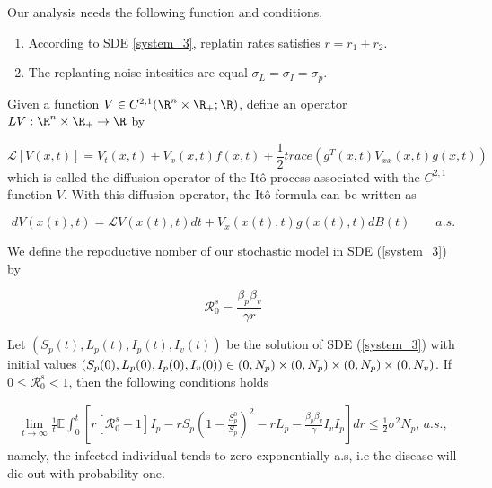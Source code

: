 Our analysis needs the following function and conditions.
\begin{enumerate}[(H-1)]
	\item
	According to SDE \eqref{system_3}, replatin rates satisfies 
	$r=r_1+r_2$. 
	\item
	The replanting noise intesities are equal
	$\sigma_L = \sigma_I = \sigma_p$.
\end{enumerate}
Given a function $V\in C^{2,1}(\R^n\times\R_{+};\R)$, define an operator $LV:\R^n\times\R_{+}\rightarrow\R$ by

\begin{equation}\label{InfiOpera}
	\mathcal{L}[V(x,t)] = V_t(x,t)+V_x(x,t)f(x,t)+\frac{1}{2}trace(g^T(x,t)V_{xx}(x,t)g(x,t))
\end{equation}
%
which is called the diffusion operator of the It\^{o} process associated with the $C^{2,1}$ function $V$. With this diffusion operator, the It\^{o} formula can be written as

\begin{equation}\label{Itoformula}
dV(x(t),t) = \mathcal{L}V(x(t),t)dt+V_x(x(t),t)g(x(t),t)dB(t)\qquad a.s.
\end{equation}

We define the repoductive nomber of our stochastic model in SDE (\ref{system_3}) by

\begin{equation}\label{eq5}
	\mathcal{R}_0^s=\frac{\beta_p\beta_v}{\gamma r}
\end{equation}

\begin{theorem}\label{theorem_2}
	Let $(S_p(t),L_p(t),I_p(t),I_v(t))$ be the solution of SDE (\ref{system_3}) with initial values $(S_p(0),L_p(0),I_p(0),I_v(0))\in (0,N_p)\times(0,N_p)\times(0,N_p)\\\times(0,N_v)$. If $0\leq \mathcal{R}^s_0<1$, then the following conditions holds

	\begin{align*}
		\lim\limits_{t\rightarrow \infty}\frac{1}{t}\mathbb{E}\int_{0}^{t}\left[{r[\mathcal{R}^s_0-1]I_p-rS_p\left(1-\frac{S^0_p}{S_p}\right)^2-rL_p-\frac{\beta_p\beta_v}{\gamma}I_vI_p}\right]dr\leq \frac{1}{2}\sigma^2N_p,\, a.s.,
	\end{align*}
	namely, the infected individual tends to zero exponentially a.s, i.e the disease will die out with probability one.
\end{theorem}


